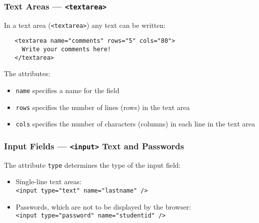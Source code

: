 \documentclass[dvipsnames]{beamer}
\begin{document}
\begin{frame}[fragile]
\frametitle{Text Areas --- \texttt{<textarea>}}
  
  In a text area (\verb+<textarea>+) any text can be written:

\begin{verbatim}
   <textarea name="comments" rows="5" cols="80">
     Write your comments here!
   </textarea>
\end{verbatim}

The attributes:

\begin{itemize}
\item \verb+name+ specifies a name for the field

\item \verb+rows+ specifies the number of lines (rows) in the text area
  
\item \verb+cols+ specifies the number of characters (columns) in each
  line in the text area
\end{itemize}


\end{frame}

\begin{frame}[fragile]
\frametitle{Input Fields --- \texttt{<input>} Text and Passwords}
  
  The attribute \verb+type+ determines the type of the input field:

\begin{itemize}
\item Single-line text areas:\\
\verb+<input type="text" name="lastname" />+


\item Passwords, which are not to be displayed by the browser:\\
  \verb+<input type="password" name="studentid" />+
  
\end{itemize}
\end{frame}
 
\end{document}
